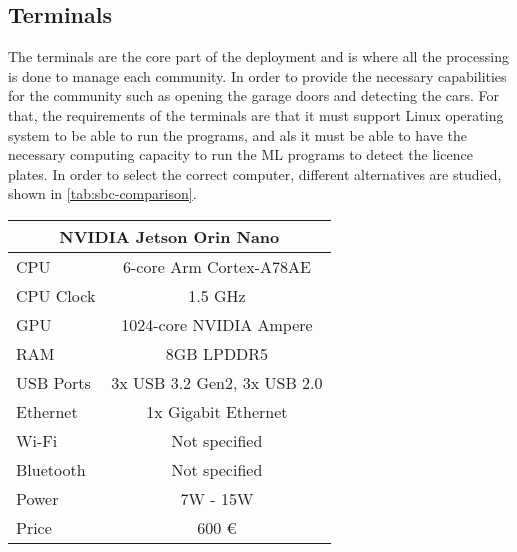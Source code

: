 \subsection{Terminals}

The terminals are the core part of the deployment and is where all the processing is done to manage each community. In order to provide the necessary capabilities for the community such as opening the garage doors and detecting the cars. For that, the requirements of the terminals are that it must support Linux operating system to be able to run the programs, and als it must be able to have the necessary computing capacity to run the \gls{ML} programs to detect the licence plates. In order to select the correct computer, different alternatives are studied, shown in \cref{tab:sbc-comparison}.

\begin{longtable}{|l|c|}
	\hline

	\multicolumn{2}{|c|}{\textbf{NVIDIA Jetson Orin Nano}}                    \\
	\hline
	CPU       & 6-core Arm Cortex-A78AE                                       \\
	CPU Clock & 1.5 GHz                                                       \\
	GPU       & 1024-core NVIDIA Ampere                                       \\
	RAM       & 8GB LPDDR5                                                    \\
	USB Ports & 3x USB 3.2 Gen2, 3x USB 2.0                                   \\
	Ethernet  & 1x Gigabit Ethernet                                           \\
	Wi-Fi     & Not specified                                                 \\
	Bluetooth & Not specified                                                 \\
	Power     & 7W - 15W                                                      \\
	Price     & 600 \euro                                                     \\
	\hline


\end{longtable}
